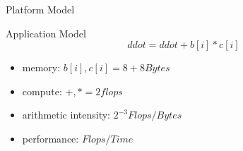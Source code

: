 \begin{nframe}{Platform Model}
\begin{minipage}{.5\textwidth}
\begin{figure}
  \end{figure}
  \end{minipage}
\end{nframe}


\begin{nframe}{Application Model}
  \vspace{1cm}
  \begin{equation}
    ddot = ddot + b[i] * c[i]
  \end{equation}

  \vspace{1cm}

  \begin{itemize}
  \item memory: ${b[i], c[i]} = 8+8 Bytes$
  \item compute: ${+,*} = 2 flops$
  \item arithmetic intensity: $2^{-3} Flops/Bytes$
  \item performance: $Flops/Time$
  \end{itemize}
\end{nframe}


